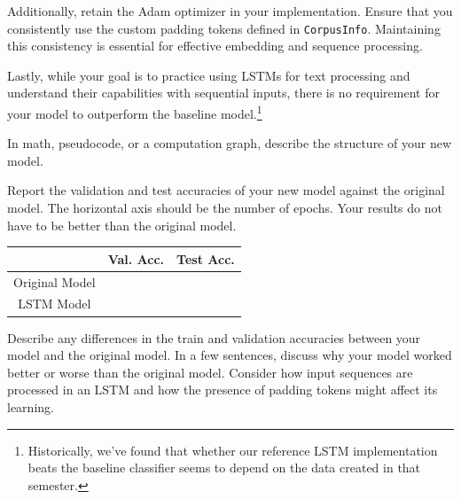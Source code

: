 \documentclass[11pt,addpoints,answers]{exam}
\begin{document}
\begin{questions}
\begin{parts}
Additionally, retain the Adam optimizer in your implementation. Ensure that you consistently use the custom padding tokens defined in \lstinline{CorpusInfo}. Maintaining this consistency is essential for effective embedding and sequence processing.

Lastly, while your goal is to practice using LSTMs for text processing and understand their capabilities with sequential inputs, there is no requirement for your model to outperform the baseline model.\footnote{Historically, we've found that whether our reference LSTM implementation beats the baseline classifier seems to depend on the data created in that semester.}

\clearpage
\begin{subparts}

    \subpart[2] In math, pseudocode, or a computation graph, describe the structure of your new model.
    \begin{answer_box}[title=,height=7cm, width=15cm]
    \end{answer_box}

    \subpart[4] Report the validation and test accuracies of your new model against the original model. The horizontal axis should be the number of epochs. Your results do not have to be better than the original model.  

    \begin{answer_box}[title=,height=3cm, width=10cm]
    \begin{tabular}{ccc}
        \toprule
        & Val. Acc. & Test Acc. \\
        \midrule
        Original Model & & \\
        LSTM Model & & \\
        \bottomrule
    \end{tabular}
    
    \end{answer_box}

    \subpart[2] Describe any differences in the train and validation accuracies between your model and the original model. In a few sentences, discuss why your model worked better or worse than the original model. Consider how input sequences are processed in an LSTM and how the presence of padding tokens might affect its learning.

    \begin{answer_box}[title=,height=4cm, width=15cm]
    \end{answer_box}
    
\end{subparts}


\end{parts}
\end{questions}
\end{document}
